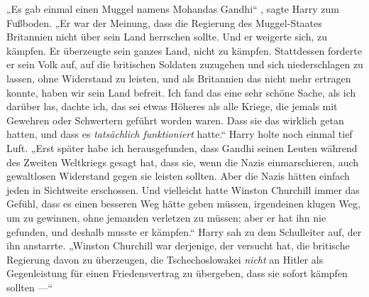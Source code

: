 „Es gab einmal einen Muggel namens Mohandas Gandhi“%
%
, sagte Harry zum Fußboden.
„Er war der Meinung, dass die Regierung des Muggel-Staates Britannien nicht über sein Land herrschen sollte. Und er weigerte sich, zu kämpfen. Er überzeugte sein ganzes Land, nicht zu kämpfen. Stattdessen forderte er sein Volk auf, auf die britischen Soldaten zuzugehen und sich niederschlagen zu lassen, ohne Widerstand zu leisten, und als Britannien das nicht mehr ertragen konnte, haben wir sein Land befreit. Ich fand das eine sehr schöne Sache, als ich darüber las, dachte ich, das sei etwas Höheres als alle Kriege, die jemals mit Gewehren oder Schwertern geführt worden waren. Dass sie das wirklich getan hatten, und dass es \emph{tatsächlich funktioniert} hatte.“ Harry holte noch einmal tief Luft.
„Erst später habe ich herausgefunden, dass Gandhi seinen Leuten während des Zweiten Weltkriegs gesagt hat, dass sie, wenn die Nazis einmarschieren, auch gewaltlosen Widerstand gegen sie leisten sollten. Aber die Nazis hätten einfach jeden in Sichtweite erschossen. Und vielleicht hatte Winston Churchill immer das Gefühl, dass es einen besseren Weg hätte geben müssen, irgendeinen klugen Weg, um zu gewinnen, ohne jemanden verletzen zu müssen; aber er hat ihn nie gefunden, und deshalb musste er kämpfen.“ Harry sah zu dem Schulleiter auf, der ihn anstarrte.
„Winston Churchill war derjenige, der versucht hat, die britische Regierung davon zu überzeugen, die Tschechoslowakei \emph{nicht} an Hitler als Gegenleistung für einen Friedensvertrag zu übergeben, dass sie sofort kämpfen sollten —“

